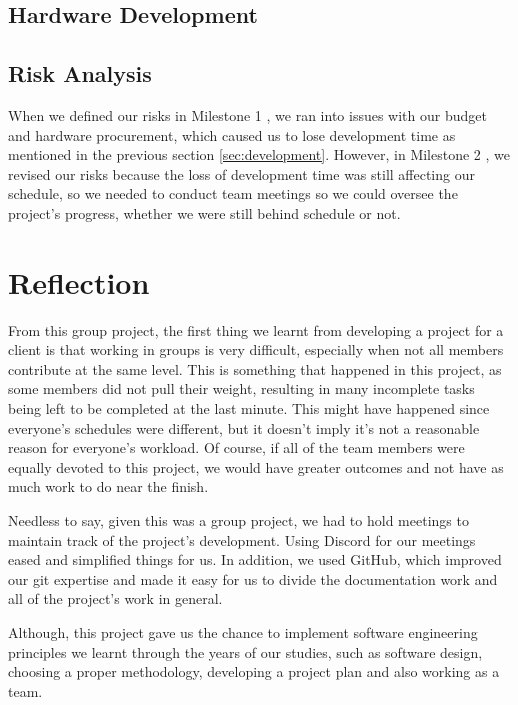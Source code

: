 
    \subsection{Hardware Development}
    \label{ssec:hardware}


    \subsection{Risk Analysis}
    \label{ssec:}

    When we defined our risks in Milestone 1 \cite{coaker}, we ran into issues with our budget and hardware procurement, which caused us to lose development time as mentioned in the previous section \ref{sec:development}. However, in Milestone 2 \cite{mile2}, we revised our risks because the loss of development time was still affecting our schedule, so we needed to conduct team meetings so we could oversee the project's progress, whether we were still behind schedule or not.

    \section{Reflection}
    \label{sec:Reflection}

    From this group project, the first thing we learnt from developing a project for a client is that working in groups is very difficult, especially when not all members contribute at the same level. This is something that happened in this project, as some members did not pull their weight, resulting in many incomplete tasks being left to be completed at the last minute. This might have happened since everyone's schedules were different, but it doesn't imply it's not a reasonable reason for everyone's workload. Of course, if all of the team members were equally devoted to this project, we would have greater outcomes and not have as much work to do near the finish.

    Needless to say, given this was a group project, we had to hold meetings to maintain track of the project's development. Using Discord for our meetings eased and simplified things for us. In addition, we used GitHub, which improved our git expertise and made it easy for us to divide the documentation work and all of the project's work in general.

    Although, this project gave us the chance to implement software engineering principles we learnt through the years of our studies, such as software design, choosing a proper methodology, developing a project plan and also working as a team.
